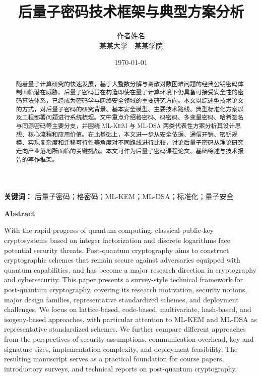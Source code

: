 ﻿\documentclass[12pt,a4paper]{ctexart}
\title{\heiti 后量子密码技术框架与典型方案分析}
\author{作者姓名\\[0.5em]
\small 某某大学~~某某学院}
\date{\today}
\numberwithin{equation}{section}
\newcommand{\keywords}[1]{\par\noindent\textbf{关键词：} #1}
\begin{document}
\maketitle

\begin{abstract}
随着量子计算研究的快速发展，基于大整数分解与离散对数困难问题的经典公钥密码体制面临潜在威胁。后量子密码旨在构造即使在量子计算环境下仍具备可接受安全性的密码算法体系，已经成为密码学与网络安全领域的重要研究方向。本文以综述型技术论文的方式，对后量子密码的研究背景、基本安全模型、主要技术路线、典型标准化方案以及工程部署问题进行系统梳理。文中重点介绍格密码、码密码、多变量密码、哈希签名与同源密码等主要分支，并围绕 ML-KEM 与 ML-DSA 两类代表性方案分析其设计思想、核心流程和应用价值。在此基础上，本文进一步从安全依据、通信开销、密钥规模、实现复杂度和迁移可行性等角度对不同路线进行比较，讨论后量子密码从理论研究走向产业落地所面临的关键挑战。本文可作为后量子密码课程论文、基础综述与技术报告的写作框架。
\end{abstract}

\keywords{后量子密码；格密码；ML-KEM；ML-DSA；标准化；量子安全}

\vspace{1.5em}
\begin{center}
    {\bfseries\large Abstract}
\end{center}
With the rapid progress of quantum computing, classical public-key cryptosystems based on integer factorization and discrete logarithms face potential security threats. Post-quantum cryptography aims to construct cryptographic schemes that remain secure against adversaries equipped with quantum capabilities, and has become a major research direction in cryptography and cybersecurity. This paper presents a survey-style technical framework for post-quantum cryptography, covering its research motivation, security notions, major design families, representative standardized schemes, and deployment challenges. We focus on lattice-based, code-based, multivariate, hash-based, and isogeny-based approaches, with particular attention to ML-KEM and ML-DSA as representative standardized schemes. We further compare different approaches from the perspectives of security assumptions, communication overhead, key and signature sizes, implementation complexity, and deployment feasibility. The resulting manuscript serves as a practical foundation for course papers, introductory surveys, and technical reports on post-quantum cryptography.
\end{document}
